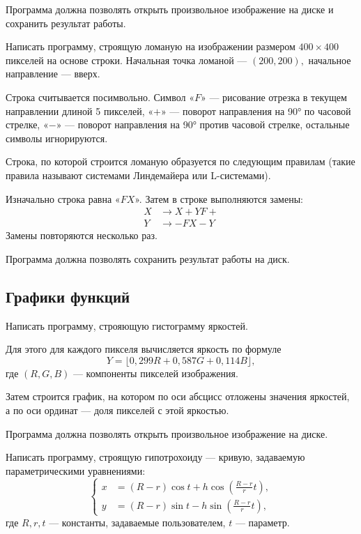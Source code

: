 Программа должна позволять открыть произвольное изображение на диске и
сохранить результат работы.

\task Написать программу, строящую ломаную на изображении размером
$400 \times 400$ пикселей на основе строки. Начальная точка ломаной —
$(200, 200),$ начальное направление — вверх.

Строка считывается посимвольно. Символ «$F$» — рисование отрезка в
текущем направлении длиной 5 пикселей, «$+$» — поворот направления на
90° по часовой стрелке, «$-$» — поворот направления на 90° против
часовой стрелке, остальные символы игнорируются.

Строка, по которой строится ломаную образуется по следующим правилам
(такие правила называют системами Линдемайера или L-системами).

Изначально строка равна «$FX$». Затем в строке выполняются замены:
\[
\begin{aligned}
  X &\to X+YF+\\
  Y &\to -FX-Y
\end{aligned}
\]
Замены повторяются несколько раз.

Программа должна позволять сохранить результат работы на диск.


\subsection{Графики функций}

\task Написать программу, строяющую гистограмму яркостей.

Для этого для каждого пикселя вычисляется яркость по формуле
\[
Y = \lfloor 0{,}299 R + 0{,}587 G + 0{,}114 B \rfloor,
\]
где $(R,G,B)$ — компоненты пикселей изображения.

Затем строится график, на котором по оси абсцисс отложены значения
яркостей, а по оси ординат — доля пикселей с этой яркостью.

Программа должна позволять открыть произвольное изображение на диске.

\task Написать программу, строящую гипотрохоиду — кривую, задаваемую
параметрическими уравнениями:
\[
\left\{
  \begin{aligned}
    x &= \left( R - r \right) \cos t + h \cos \left( \frac{R-r}r t \right),\\
    y &= \left( R - r \right) \sin t - h \sin \left( \frac{R-r}r t \right),
  \end{aligned}
\right.
\]
где $R, r, t$ — константы, задаваемые пользователем, $t$ — параметр.

